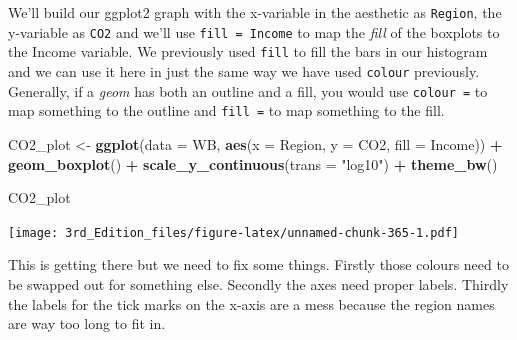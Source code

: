 \documentclass[
]{book}
\newenvironment{Shaded}{\begin{snugshade}}{\end{snugshade}}
\newcommand{\CommentTok}[1]{\textcolor[rgb]{0.56,0.35,0.01}{\textit{#1}}}
\newcommand{\DataTypeTok}[1]{\textcolor[rgb]{0.13,0.29,0.53}{#1}}
\newcommand{\KeywordTok}[1]{\textcolor[rgb]{0.13,0.29,0.53}{\textbf{#1}}}
\newcommand{\NormalTok}[1]{#1}
\newcommand{\OperatorTok}[1]{\textcolor[rgb]{0.81,0.36,0.00}{\textbf{#1}}}
\newcommand{\StringTok}[1]{\textcolor[rgb]{0.31,0.60,0.02}{#1}}
\begin{document}
\begin{Shaded}
\end{Shaded}

We'll build our ggplot2 graph with the x-variable in the aesthetic as \texttt{Region}, the y-variable as \texttt{CO2} and we'll use \texttt{fill\ =\ Income} to map the \emph{fill} of the boxplots to the Income variable. We previously used \texttt{fill} to fill the bars in our histogram and we can use it here in just the same way we have used \texttt{colour} previously. Generally, if a \emph{geom} has both an outline and a fill, you would use \texttt{colour\ =} to map something to the outline and \texttt{fill\ =} to map something to the fill.

\begin{Shaded}
\begin{Highlighting}[]
\NormalTok{CO2_plot <-}\StringTok{ }\KeywordTok{ggplot}\NormalTok{(}\DataTypeTok{data =}\NormalTok{ WB, }\KeywordTok{aes}\NormalTok{(}\DataTypeTok{x =}\NormalTok{ Region,}
                                  \DataTypeTok{y =}\NormalTok{ CO2,}
                                  \DataTypeTok{fill =}\NormalTok{ Income)) }\OperatorTok{+}
\StringTok{        }\KeywordTok{geom_boxplot}\NormalTok{() }\OperatorTok{+}
\StringTok{        }\KeywordTok{scale_y_continuous}\NormalTok{(}\DataTypeTok{trans =} \StringTok{"log10"}\NormalTok{) }\OperatorTok{+}
\StringTok{        }\KeywordTok{theme_bw}\NormalTok{()}

\NormalTok{CO2_plot}
\end{Highlighting}
\end{Shaded}

\texttt{[image: 3rd\_Edition\_files/figure-latex/unnamed-chunk-365-1.pdf]}

This is getting there but we need to fix some things. Firstly those colours need to be swapped out for something else. Secondly the axes need proper labels. Thirdly the labels for the tick marks on the x-axis are a mess because the region names are way too long to fit in.
\end{document}
